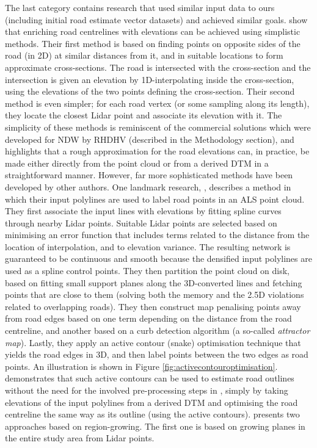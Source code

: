 The last category contains research that used similar input data to ours (including initial road estimate vector datasets) and achieved similar goals. \cite{cai_rasdorf_2008} show that enriching road centrelines with elevations can be achieved using simplistic methods. Their first method is based on finding points on opposite sides of the road (in 2D) at similar distances from it, and in suitable locations to form approximate cross-sections. The road is intersected with the cross-section and the intersection is given an elevation by 1D-interpolating inside the cross-section, using the elevations of the two points defining the cross-section. Their second method is even simpler; for each road vertex  (or some sampling along its length), they locate the closest Lidar point and associate its elevation with it. The simplicity of these methods is reminiscent of the commercial solutions which were developed for NDW by RHDHV (described in the Methodology section), and highlights that a rough approximation for the road elevations can, in practice, be made either directly from the point cloud or from a derived DTM in a straightforward manner. However, far more sophisticated methods have been developed by other authors. One landmark research, \cite{boyko_funkhauser_2011}, describes a method in which their input polylines are used to label road points in an ALS point cloud. They first associate the input lines with elevations by fitting spline curves through nearby Lidar points. Suitable Lidar points are selected based on minimising an error function that includes terms related to the distance from the location of interpolation, and to elevation variance. The resulting network is guaranteed to be continuous and smooth because the densified input polylines are used as a spline control points. They then partition the point cloud on disk, based on fitting small support planes along the 3D-converted lines and fetching points that are close to them (solving both the memory and the 2.5D violations related to overlapping roads). They then construct map penalising points away from road edges based on one term depending on the distance from the road centreline, and another based on a curb detection algorithm (a so-called \textit{attractor map}). Lastly, they apply an active contour (snake) optimisation technique that yields the road edges in 3D, and then label points between the two edges as road points. An illustration is shown in Figure \ref{fig:activecontouroptimisation}. \cite{gopfert_etal_2011} demonstrates that such active contours can be used to estimate road outlines without the need for the involved pre-processing steps in \cite{boyko_funkhauser_2011}, simply by taking elevations of the input polylines from a derived DTM and optimising the road centreline the same way as its outline (using the active contours). \cite{hatger_brenner_2003} presents two approaches based on region-growing. The first one is based on growing planes in the entire study area from Lidar points.
